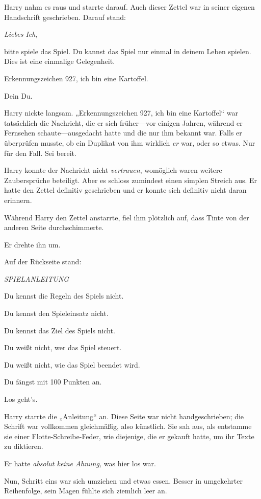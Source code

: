 {Harry nahm es raus und starrte darauf. Auch dieser Zettel war in seiner eigenen Handschrift geschrieben. Darauf stand:

\emph{Liebes Ich,}

bitte spiele das Spiel. Du kannst das Spiel nur einmal in deinem Leben spielen. Dies ist eine einmalige Gelegenheit.

Erkennungszeichen 927, ich bin eine Kartoffel.

Dein Du.

Harry nickte langsam. „Erkennungszeichen 927, ich bin eine Kartoffel“ war tatsächlich die Nachricht, die er sich früher—vor einigen Jahren, während er Fernsehen schaute—ausgedacht hatte und die nur ihm bekannt war. Falls er überprüfen musste, ob ein Duplikat von ihm wirklich \emph{er} war, oder so etwas. Nur für den Fall. Sei bereit.

Harry konnte der Nachricht nicht \emph{vertrauen}, womöglich waren weitere Zaubersprüche beteiligt. Aber es schloss zumindest einen simplen Streich aus. Er hatte den Zettel definitiv geschrieben und er konnte sich definitiv nicht daran erinnern.

Während Harry den Zettel anstarrte, fiel ihm plötzlich auf, dass Tinte von der anderen Seite durchschimmerte.

Er drehte ihn um.

Auf der Rückseite stand:

\emph{SPIELANLEITUNG}

Du kennst die Regeln des Spiels nicht.

Du kennst den Spieleinsatz nicht.

Du kennst das Ziel des Spiels nicht.

Du weißt nicht, wer das Spiel steuert.

Du weißt nicht, wie das Spiel beendet wird.

Du fängst mit 100 Punkten an.

Los geht's.

Harry starrte die „Anleitung“ an. Diese Seite war nicht handgeschrieben; die Schrift war vollkommen gleichmäßig, also künstlich. Sie sah aus, als entstamme sie einer Flotte-Schreibe-Feder, wie diejenige, die er gekauft hatte, um ihr Texte zu diktieren.

Er hatte \emph{absolut keine Ahnung,} was hier los war.

Nun, Schritt eins war sich umziehen und etwas essen. Besser in umgekehrter Reihenfolge, sein Magen fühlte sich ziemlich leer an.

}
